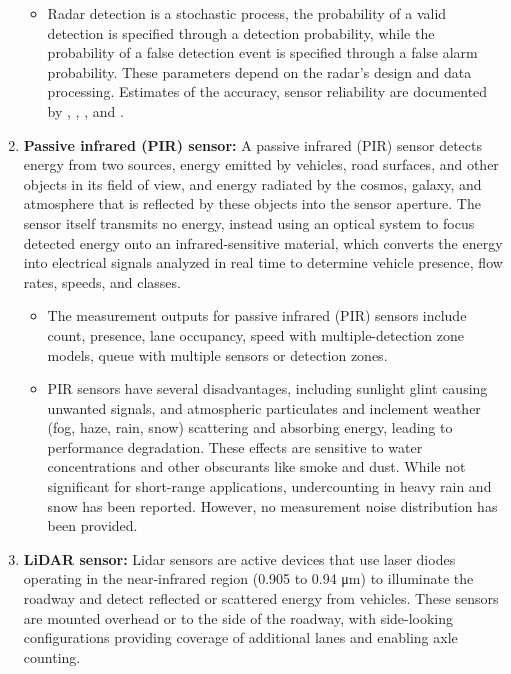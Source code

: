 \begin{enumerate}
\begin{itemize}
        \item Radar detection is a stochastic process, the probability of a valid detection is specified through a detection probability, while the probability of a false detection event is specified through a false alarm probability. These parameters depend on the radar's design and data processing. Estimates of the accuracy, sensor reliability are documented by \textcite{middleton2000initial}, \textcite{middleton2009alternative}, \textcite{middleton2002vehicle}, \textcite{mohammed2015evaluating} and \textcite{yu2013performance}.
    \end{itemize}
    \item \textbf{Passive infrared (PIR) sensor:} A passive infrared (PIR) sensor detects energy from two sources, energy emitted by vehicles, road surfaces, and other objects in its field of view, and energy radiated by the cosmos, galaxy, and atmosphere that is reflected by these objects into the sensor aperture. The sensor itself transmits no energy, instead using an optical system to focus detected energy onto an infrared-sensitive material, which converts the energy into electrical signals analyzed in real time to determine vehicle presence, flow rates, speeds, and classes.
    \begin{itemize}
        \item The measurement outputs for passive infrared (PIR) sensors include count, presence, lane occupancy, speed with multiple-detection zone models, queue with multiple sensors or detection zones.
        \item PIR sensors have several disadvantages, including sunlight glint causing unwanted signals, and atmospheric particulates and inclement weather (fog, haze, rain, snow) scattering and absorbing energy, leading to performance degradation. These effects are sensitive to water concentrations and other obscurants like smoke and dust. While not significant for short-range applications, undercounting in heavy rain and snow has been reported. However, no measurement noise distribution has been provided.
    \end{itemize}
    \item \textbf{LiDAR sensor:} Lidar sensors are active devices that use laser diodes operating in the near-infrared region (0.905 to 0.94 μm) to illuminate the roadway and detect reflected or scattered energy from vehicles. These sensors are mounted overhead or to the side of the roadway, with side-looking configurations providing coverage of additional lanes and enabling axle counting.

\end{enumerate}
